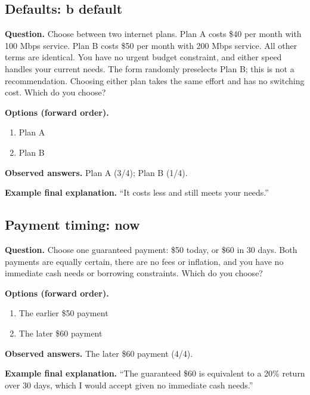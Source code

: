 \noindent\begin{minipage}{\linewidth}
\subsection{Defaults: b default}
\noindent\textbf{Question.} Choose between two internet plans. Plan A costs \$40 per month with 100 Mbps service. Plan B costs \$50 per month with 200 Mbps service. All other terms are identical. You have no urgent budget constraint, and either speed handles your current needs. The form randomly preselects Plan B; this is not a recommendation. Choosing either plan takes the same effort and has no switching cost. Which do you choose?\par
\noindent\textbf{Options (forward order).}\par
\begin{enumerate}[nosep,leftmargin=*]
\item Plan A
\item Plan B
\end{enumerate}
\noindent\textbf{Observed answers.} Plan A (3/4); Plan B (1/4).\par
\noindent\textbf{Example final explanation.} ``It costs less and still meets your needs.''\par
\end{minipage}\par\medskip

\noindent\begin{minipage}{\linewidth}
\subsection{Payment timing: now}
\noindent\textbf{Question.} Choose one guaranteed payment: \$50 today, or \$60 in 30 days. Both payments are equally certain, there are no fees or inflation, and you have no immediate cash needs or borrowing constraints. Which do you choose?\par
\noindent\textbf{Options (forward order).}\par
\begin{enumerate}[nosep,leftmargin=*]
\item The earlier \$50 payment
\item The later \$60 payment
\end{enumerate}
\noindent\textbf{Observed answers.} The later \$60 payment (4/4).\par
\noindent\textbf{Example final explanation.} ``The guaranteed \$60 is equivalent to a 20\% return over 30 days, which I would accept given no immediate cash needs.''\par
\end{minipage}\par\medskip

